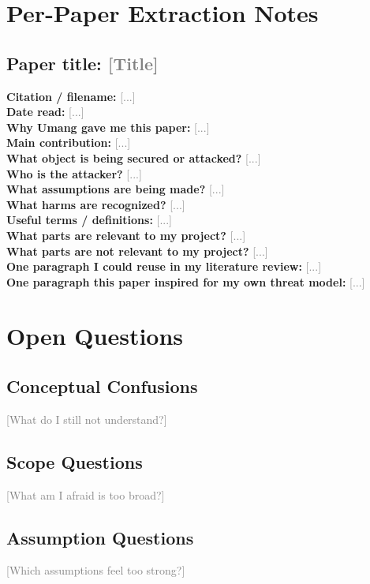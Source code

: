 \documentclass[11pt]{article}
\newcommand{\fillin}[1]{\textcolor{gray}{[#1]}}
\begin{document}
\section{Per-Paper Extraction Notes}

\subsection*{Paper title: \fillin{Title}}
\textbf{Citation / filename:} \fillin{...} \\
\textbf{Date read:} \fillin{...} \\
\textbf{Why Umang gave me this paper:} \fillin{...} \\
\textbf{Main contribution:} \fillin{...} \\
\textbf{What object is being secured or attacked?} \fillin{...} \\
\textbf{Who is the attacker?} \fillin{...} \\
\textbf{What assumptions are being made?} \fillin{...} \\
\textbf{What harms are recognized?} \fillin{...} \\
\textbf{Useful terms / definitions:} \fillin{...} \\
\textbf{What parts are relevant to my project?} \fillin{...} \\
\textbf{What parts are not relevant to my project?} \fillin{...} \\
\textbf{One paragraph I could reuse in my literature review:} \fillin{...} \\
\textbf{One paragraph this paper inspired for my own threat model:} \fillin{...}

\section{Open Questions}

\subsection{Conceptual Confusions}
\fillin{What do I still not understand?}

\subsection{Scope Questions}
\fillin{What am I afraid is too broad?}

\subsection{Assumption Questions}
\fillin{Which assumptions feel too strong?}
\end{document}
